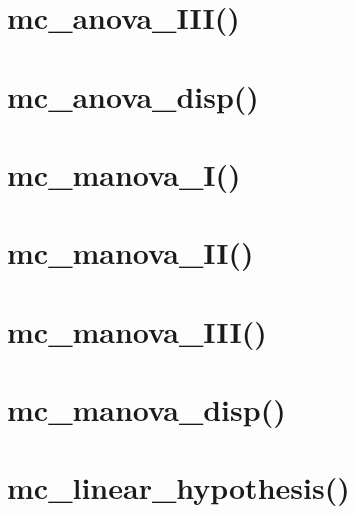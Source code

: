 \section{mc\_anova\_III()}

\section{mc\_anova\_disp()}

\section{mc\_manova\_I()}

\section{mc\_manova\_II()}

\section{mc\_manova\_III()}

\section{mc\_manova\_disp()}

\section{mc\_linear\_hypothesis()}

